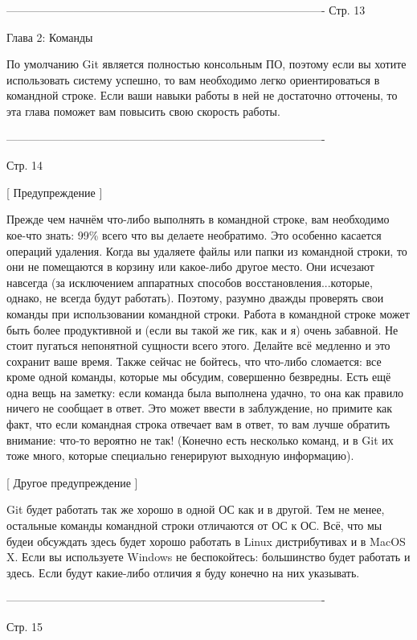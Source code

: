 -------------------------------------------------------------------------------------
Стр. 13

Глава 2: Команды

По умолчанию Git является полностью консольным ПО, поэтому если вы хотите
использовать систему успешно, то вам необходимо легко ориентироваться в командной
строке. Если ваши навыки работы в ней не достаточно отточены, то эта глава поможет 
вам повысить свою скорость работы.

-------------------------------------------------------------------------------------

Стр. 14

[ Предупреждение ]

Прежде чем начнём что-либо выполнять в командной строке, вам необходимо кое-что
знать: 99\% всего что вы делаете необратимо. Это особенно касается операций удаления.
Когда вы удаляете файлы или папки из командной строки, то они не помещаются в корзину
или какое-либо другое место. Они исчезают навсегда (за исключением аппаратных 
способов восстановления...которые, однако, не всегда будут работать). Поэтому, 
разумно дважды проверять свои команды при использовании командной строки.
Работа в командной строке может быть более продуктивной и (если вы такой же гик, как 
и я) очень забавной. Не стоит пугаться непонятной сущности всего этого. Делайте всё
медленно и это сохранит ваше время.
Также сейчас не бойтесь, что что-либо сломается: все кроме одной команды, которые
мы обсудим, совершенно безвредны.
Есть ещё одна вещь на заметку: если команда была выполнена удачно, то она как правило
ничего не сообщает в ответ. Это может ввести в заблуждение, но примите как факт, что
если командная строка отвечает вам в ответ, то вам лучше обратить внимание: что-то
вероятно не так! (Конечно есть несколько команд, и в Git их тоже много, которые
специально генерируют выходную информацию).

[ Другое предупреждение ]

Git будет работать так же хорошо в одной ОС как и в другой. Тем не менее, остальные
команды командной строки отличаются от ОС к ОС. Всё, что мы будеи обсуждать здесь
будет хорошо работать в Linux дистрибутивах и в MacOS X. Если вы используете Windows
не беспокойтесь: большинство будет работать и здесь. Если будут какие-либо отличия я
буду конечно на них указывать.

-------------------------------------------------------------------------------------

Стр. 15

